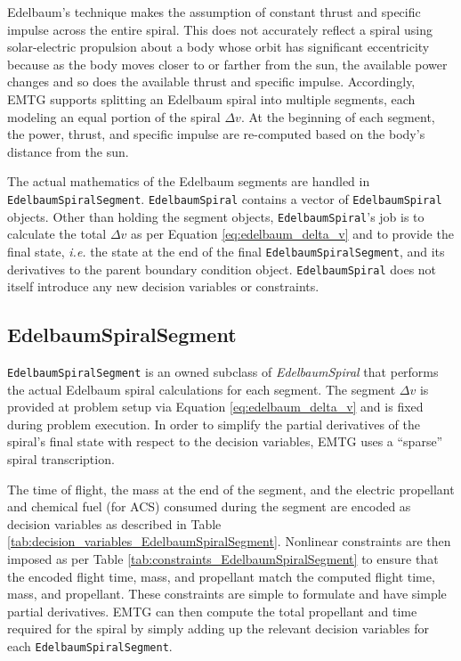 Edelbaum's technique makes the assumption of constant thrust and specific impulse across the entire spiral. This does not accurately reflect a spiral using solar-electric propulsion about a body whose orbit has significant eccentricity because as the body moves closer to or farther from the sun, the available power changes and so does the available thrust and specific impulse. Accordingly, EMTG supports splitting an Edelbaum spiral into multiple segments, each modeling an equal portion of the spiral $\Delta v$. At the beginning of each segment, the power, thrust, and specific impulse are re-computed based on the body's distance from the sun.

The actual mathematics of the Edelbaum segments are handled in \texttt{EdelbaumSpiralSegment}. \texttt{EdelbaumSpiral} contains a vector of \texttt{EdelbaumSpiral} objects. Other than holding the segment objects, \texttt{EdelbaumSpiral}'s job is to calculate the total $\Delta v$ as per Equation \ref{eq:edelbaum_delta_v} and to provide the final state, \textit{i.e.} the state at the end of the final \texttt{EdelbaumSpiralSegment}, and its derivatives to the parent boundary condition object. \texttt{EdelbaumSpiral} does not itself introduce any new decision variables or constraints.

\subsection{EdelbaumSpiralSegment}
\label{subsec:EdelbaumSpiralSegment}

\texttt{EdelbaumSpiralSegment} is an owned subclass of \textit{EdelbaumSpiral} that performs the actual Edelbaum spiral calculations for each segment. The segment $\Delta v$ is provided at problem setup via Equation \ref{eq:edelbaum_delta_v} and is fixed during problem execution. In order to simplify the partial derivatives of the spiral's final state with respect to the decision variables, EMTG uses a ``sparse'' spiral transcription.

The time of flight, the mass at the end of the segment, and the electric propellant and chemical fuel (for ACS) consumed during the segment are encoded as decision variables as described in Table \ref{tab:decision_variables_EdelbaumSpiralSegment}. Nonlinear constraints are then imposed as per Table \ref{tab:constraints_EdelbaumSpiralSegment} to ensure that the encoded flight time, mass, and propellant match the computed flight time, mass, and propellant. These constraints are simple to formulate and have simple partial derivatives. EMTG can then compute the total propellant and time required for the spiral by simply adding up the relevant decision variables for each \texttt{EdelbaumSpiralSegment}.

